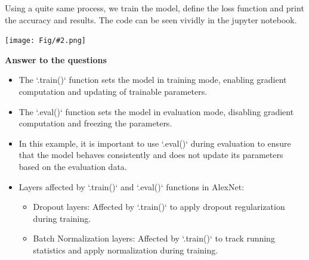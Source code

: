 \documentclass[]{article}
\newcommand{\pict}[2]{\begin{center}
		\texttt{[image: Fig/\#2.png]}
\end{center}}
\begin{document}
	Using a quite same process, we train the model, define the loss function and print the accuracy and results. The code can be seen vividly in the jupyter notebook.
	\pict{0.5}{F10}
	\textbf{Answer to the questions}\\
	\begin{itemize}
		\item The `.train()` function sets the model in training mode, enabling gradient computation and updating of trainable parameters.
		\item The `.eval()` function sets the model in evaluation mode, disabling gradient computation and freezing the parameters.
		\item In this example, it is important to use `.eval()` during evaluation to ensure that the model behaves consistently
		and does not update its parameters based on the evaluation data.
		\item Layers affected by `.train()` and `.eval()` functions in AlexNet:
			\begin{itemize}
				\item Dropout layers: Affected by `.train()` to apply dropout regularization during training.
				\item Batch Normalization layers: Affected by `.train()` to track running statistics and apply normalization during training.
			\end{itemize}
	\end{itemize}
	
	
\end{document}

